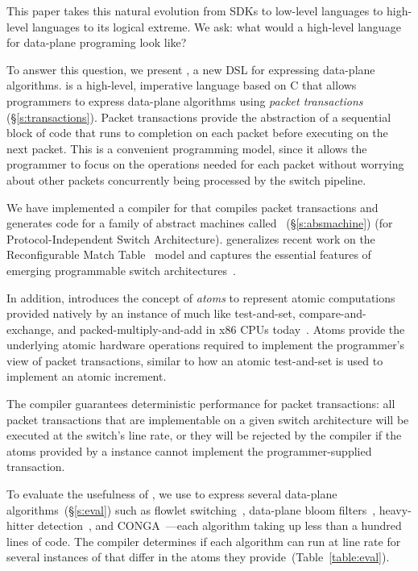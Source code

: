 This paper takes this natural evolution from SDKs to low-level languages to
high-level languages to its logical extreme. We ask: what would a high-level
language for data-plane programing look like?

To answer this question, we present \pktlanguage, a new DSL for expressing
data-plane algorithms. \pktlanguage is a high-level, imperative language based
on C that allows programmers to express data-plane algorithms using {\em packet
transactions} (\S\ref{s:transactions}).  Packet transactions provide the
abstraction of a sequential block of code that runs to completion on each
packet before executing on the next packet. This is a convenient programming
model, since it allows the programmer to focus on the operations needed for
each packet without worrying about other packets concurrently being processed
by the switch pipeline.

We have implemented a compiler for \pktlanguage that compiles \pktlanguage
packet transactions and generates code for a family of abstract machines called
\absmachine~(\S\ref{s:absmachine}) (for Protocol-Independent Switch
Architecture). \absmachine generalizes recent work on the Reconfigurable Match
Table~\cite{rmt} model and captures the essential features of emerging
programmable switch architectures~\cite{rmt, xpliant, flexpipe}.

In addition, \absmachine introduces the concept of {\em atoms} to represent
atomic computations provided natively by an instance of \absmachine much like
test-and-set, compare-and-exchange, and packed-multiply-and-add in x86 CPUs
today~\cite{x86_manual}.  Atoms provide the underlying atomic hardware
operations required to implement the programmer's view of packet transactions,
similar to how an atomic test-and-set is used to implement an atomic increment.

The \pktlanguage compiler guarantees deterministic performance for packet
transactions: all packet transactions that are implementable on a given switch
architecture will be executed at the switch's line rate, or they will be
rejected by the compiler if the atoms provided by a \absmachine instance cannot
implement the programmer-supplied transaction.

To evaluate the usefulness of \pktlanguage, we use \pktlanguage to express
several data-plane algorithms~(\S\ref{s:eval}) such as flowlet
switching~\cite{flowlets}, data-plane bloom filters~\cite{bloom}, heavy-hitter
detection~\cite{opensketch}, and CONGA~\cite{conga}---each algorithm taking
up less than a hundred lines of \pktlanguage code.  The \pktlanguage compiler
determines if each algorithm can run at line rate for several instances of
\absmachine that differ in the atoms they provide~(Table~\ref{table:eval}).
